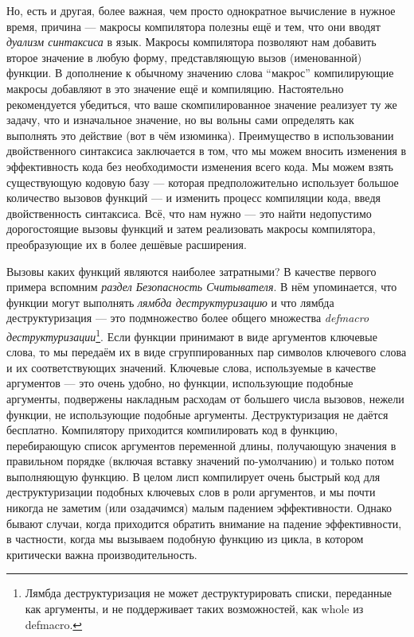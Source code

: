 Но, есть и другая, более важная, чем просто однократное вычисление в нужное время, причина --- макросы компилятора полезны ещё и тем, что они вводят \emph{дуализм синтаксиса} в язык. Макросы компилятора позволяют нам добавить второе значение в любую форму, представляющую вызов (именованной) функции. В дополнение к обычному значению слова ``макрос'' компилирующие макросы добавляют в это значение ещё и компиляцию. Настоятельно рекомендуется убедиться, что ваше скомпилированное значение реализует ту же задачу, что и изначальное значение, но вы вольны сами определять как выполнять это действие (вот в чём изюминка). Преимущество в использовании двойственного синтаксиса заключается в том, что мы можем вносить изменения в эффективность кода без необходимости изменения всего кода. Мы можем взять существующую кодовую базу --- которая предположительно использует большое количество вызовов функций --- и изменить процесс компиляции кода, введя двойственность синтаксиса. Всё, что нам нужно --- это найти недопустимо дорогостоящие вызовы функций и затем реализовать макросы компилятора, преобразующие их в более дешёвые расширения.

Вызовы каких функций являются наиболее затратными? В качестве первого примера вспомним \emph{раздел Безопасность Считывателя}. В нём упоминается, что функции могут выполнять \emph{лямбда деструктуризацию} и что лямбда деструктуризация --- это подмножество более общего множества \emph{defmacro деструктуризации}\footnote{Лямбда деструктуризация не может деструктурировать списки, переданные как аргументы, и не поддерживает таких возможностей, как whole из defmacro.}. Если функции принимают в виде аргументов ключевые слова, то мы передаём их в виде сгруппированных пар символов ключевого слова и их соответствующих значений. Ключевые слова, используемые в качестве аргументов --- это очень удобно, но функции, использующие подобные аргументы, подвержены накладным расходам от большего числа вызовов, нежели функции, не использующие подобные аргументы. Деструктуризация не даётся бесплатно. Компилятору приходится компилировать код в функцию, перебирающую список аргументов переменной длины, получающую значения в правильном порядке (включая вставку значений по-умолчанию) и только потом выполняющую функцию. В целом лисп компилирует очень быстрый код для деструктуризации подобных ключевых слов в роли аргументов, и мы почти никогда не заметим (или озадачимся) малым падением эффективности. Однако бывают случаи, когда приходится обратить внимание на падение эффективности, в частности, когда мы вызываем подобную функцию из цикла, в котором критически важна производительность.

